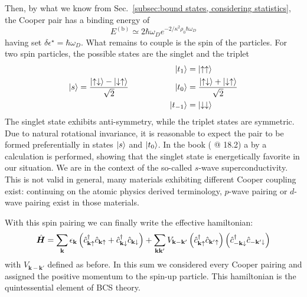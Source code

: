 Then, by what we know from Sec.~\ref{subsec:bound states, considering statistics}, the Cooper pair has a binding energy of
\[
	E^{(\mathrm{b})} \simeq 2 \hbar\omega_D e^{-2/\kappa^2 \rho_0 \hbar\omega_D}
\]
having set $\delta\epsilon^\star = \hbar\omega_D$. What remains to couple is the spin of the particles. For two spin \half particles, the possible states are the singlet and the triplet
\[
	\ket{s} = \frac{\ket{\uparrow\downarrow}-\ket{\downarrow\uparrow}}{\sqrt{2}}
	\hspace{5em}
	\begin{aligned}
		\ket{t_1} &= \ket{\uparrow\uparrow} \\
		\ket{t_0} &= \frac{\ket{\uparrow\downarrow}+\ket{\downarrow\uparrow}}{\sqrt{2}} \\
		\ket{t_{-1}} &= \ket{\downarrow\downarrow}
	\end{aligned}
\]
The singlet state exhibits anti-symmetry, while the triplet states are symmetric. Due to natural rotational invariance, it is reasonable to expect the pair to be formed preferentially in states $\ket{s}$ and $\ket{t_0}$. In the book  (\cite{grosso2000solid} @ 18.2) a by \citeauthor{grosso2000solid} a calculation is performed, showing that the singlet state is energetically favorite in our situation. We are in the context of the so-called $s$-wave superconductivity. This is not valid in general, many materials exhibiting different Cooper coupling exist: continuing on the atomic physics derived terminology, $p$-wave pairing or $d$-wave pairing exist in those materials.

With this spin pairing we can finally write the effective hamiltonian:
\[
	\hat{\bm H} = \sum_{\mathbf{k}} \epsilon_{\mathbf{k}} \left({\hat{c}_{\mathbf{k}\uparrow}^\dagger \hat{c}_{\mathbf{k}\uparrow} + \hat{c}_{\mathbf{k}\downarrow}^\dagger \hat{c}_{\mathbf{k}\downarrow}}\right) + \sum_{\mathbf{k}\mathbf{k}'} V_{\mathbf{k}-\mathbf{k}'} \left({\hat{c}_{\mathbf{k}\uparrow}^\dagger \hat{c}_{\mathbf{k}'\uparrow}}\right) \left({\hat{c}_{-\mathbf{k}\downarrow}^\dagger \hat{c}_{-\mathbf{k}'\downarrow}}\right)
\]
with $V_{\mathbf{k}-\mathbf{k}'}$ defined as before. In this sum we considered every Cooper pairing and assigned the positive momentum to the spin-up particle. This hamiltonian is the quintessential element of BCS theory.

